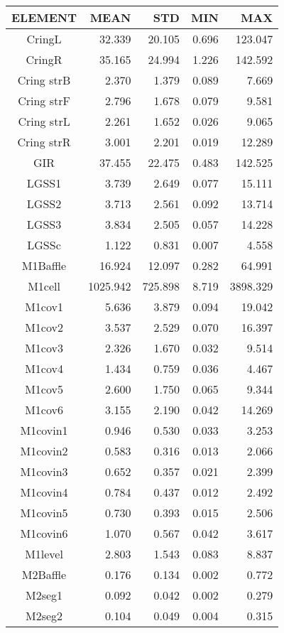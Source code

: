 \begin{longtable}{crrrr}\toprule
 ELEMENT & MEAN & STD & MIN & MAX \\\hline
 CringL & 32.339 & 20.105 & 0.696 & 123.047 \\
 CringR & 35.165 & 24.994 & 1.226 & 142.592 \\
 Cring strB & 2.370 & 1.379 & 0.089 & 7.669 \\
 Cring strF & 2.796 & 1.678 & 0.079 & 9.581 \\
 Cring strL & 2.261 & 1.652 & 0.026 & 9.065 \\
 Cring strR & 3.001 & 2.201 & 0.019 & 12.289 \\
 GIR & 37.455 & 22.475 & 0.483 & 142.525 \\
 LGSS1 & 3.739 & 2.649 & 0.077 & 15.111 \\
 LGSS2 & 3.713 & 2.561 & 0.092 & 13.714 \\
 LGSS3 & 3.834 & 2.505 & 0.057 & 14.228 \\
 LGSSc & 1.122 & 0.831 & 0.007 & 4.558 \\
 M1Baffle & 16.924 & 12.097 & 0.282 & 64.991 \\
 M1cell & 1025.942 & 725.898 & 8.719 & 3898.329 \\
 M1cov1 & 5.636 & 3.879 & 0.094 & 19.042 \\
 M1cov2 & 3.537 & 2.529 & 0.070 & 16.397 \\
 M1cov3 & 2.326 & 1.670 & 0.032 & 9.514 \\
 M1cov4 & 1.434 & 0.759 & 0.036 & 4.467 \\
 M1cov5 & 2.600 & 1.750 & 0.065 & 9.344 \\
 M1cov6 & 3.155 & 2.190 & 0.042 & 14.269 \\
 M1covin1 & 0.946 & 0.530 & 0.033 & 3.253 \\
 M1covin2 & 0.583 & 0.316 & 0.013 & 2.066 \\
 M1covin3 & 0.652 & 0.357 & 0.021 & 2.399 \\
 M1covin4 & 0.784 & 0.437 & 0.012 & 2.492 \\
 M1covin5 & 0.730 & 0.393 & 0.015 & 2.506 \\
 M1covin6 & 1.070 & 0.567 & 0.042 & 3.617 \\
 M1level & 2.803 & 1.543 & 0.083 & 8.837 \\
 M2Baffle & 0.176 & 0.134 & 0.002 & 0.772 \\
 M2seg1 & 0.092 & 0.042 & 0.002 & 0.279 \\
 M2seg2 & 0.104 & 0.049 & 0.004 & 0.315 \\

\end{longtable}
